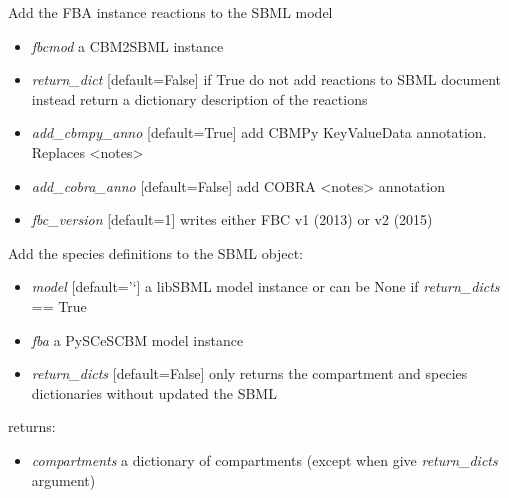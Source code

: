 \documentclass[a4paper,11pt,english]{sphinxmanual}
\begin{document}
\begin{fulllineitems}
\label{modules_doc:cbmpy.CBXML.sbml_setReactionsL3Fbc}
Add the FBA instance reactions to the SBML model
\begin{itemize}
\item {} 
\emph{fbcmod} a CBM2SBML instance

\item {} 
\emph{return\_dict} {[}default=False{]} if True do not add reactions to SBML document instead return a dictionary description of the reactions

\item {} 
\emph{add\_cbmpy\_anno} {[}default=True{]} add CBMPy KeyValueData annotation. Replaces \textless{}notes\textgreater{}

\item {} 
\emph{add\_cobra\_anno} {[}default=False{]} add COBRA \textless{}notes\textgreater{} annotation

\item {} 
\emph{fbc\_version} {[}default=1{]} writes either FBC v1 (2013) or v2 (2015)

\end{itemize}

\end{fulllineitems}


\begin{fulllineitems}
\label{modules_doc:cbmpy.CBXML.sbml_setSpeciesL2}
Add the species definitions to the SBML object:
\begin{itemize}
\item {} 
\emph{model} {[}default='`{]} a libSBML model instance or can be None if \emph{return\_dicts} == True

\item {} 
\emph{fba} a PySCeSCBM model instance

\item {} 
\emph{return\_dicts} {[}default=False{]} only returns the compartment and species dictionaries without updated the SBML

\end{itemize}

returns:
\begin{itemize}
\item {} 
\emph{compartments} a dictionary of compartments (except when give \emph{return\_dicts} argument)

\end{itemize}

\end{fulllineitems}
\end{document}
